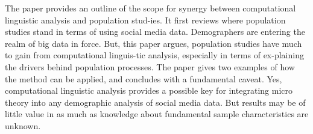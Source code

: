 The paper provides an outline of the scope for synergy between computational linguistic analysis and population stud-ies. It first reviews where population studies stand in terms of using social media data. Demographers are entering the realm of big data in force. But, this paper argues, population studies have much to gain from computational linguis-tic analysis, especially in terms of ex-plaining the drivers behind population processes. The paper gives two examples of how the method can be applied, and concludes with a fundamental caveat. Yes, computational linguistic analysis provides a possible key for integrating micro theory into any demographic analysis of social media data. But results may be of little value in as much as knowledge about fundamental sample characteristics are unknown.
